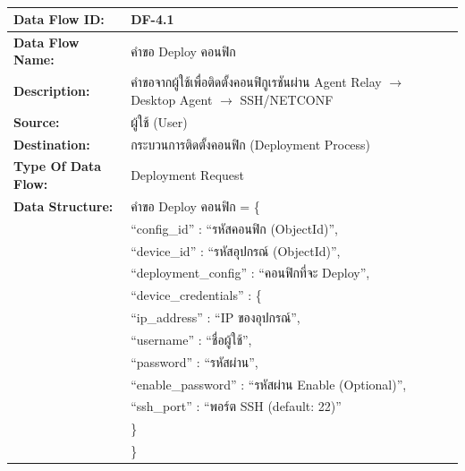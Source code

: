 \begin{table}[H]
    \caption{}
    \label{tab:df-4-1}
    \fontSixTeen 
    \begin{tabularx}{\textwidth}{|l|L|} 
        \hline
        \textbf{Data Flow ID:} & DF-4.1 \\
        \hline
        \textbf{Data Flow Name:} & คำขอ Deploy คอนฟิก \\
        \hline
        \textbf{Description:} & คำขอจากผู้ใช้เพื่อติดตั้งคอนฟิกูเรชันผ่าน Agent Relay $\rightarrow$ Desktop Agent $\rightarrow$ SSH/NETCONF \\
        \hline
        \textbf{Source:} & ผู้ใช้ (User) \\
        \hline
        \textbf{Destination:} & กระบวนการติดตั้งคอนฟิก (Deployment Process) \\
        \hline
        \textbf{Type Of Data Flow:} & Deployment Request \\
        \hline
        \textbf{Data Structure:} & คำขอ Deploy คอนฟิก = \{ \nonumber \\
                        & \hspace{1em} ``config\_id'' : ``รหัสคอนฟิก (ObjectId)'', \nonumber \\
                        & \hspace{1em} ``device\_id'' : ``รหัสอุปกรณ์ (ObjectId)'', \nonumber \\
                        & \hspace{1em} ``deployment\_config'' : ``คอนฟิกที่จะ Deploy'', \nonumber \\
                        & \hspace{1em} ``device\_credentials'' : \{ \nonumber \\
                        & \hspace{2em} ``ip\_address'' : ``IP ของอุปกรณ์'', \nonumber \\
                        & \hspace{2em} ``username'' : ``ชื่อผู้ใช้'', \nonumber \\
                        & \hspace{2em} ``password'' : ``รหัสผ่าน'', \nonumber \\
                        & \hspace{2em} ``enable\_password'' : ``รหัสผ่าน Enable (Optional)'', \nonumber \\
                        & \hspace{2em} ``ssh\_port'' : ``พอร์ต SSH (default: 22)'' \nonumber \\
                        & \hspace{1em} \} \nonumber \\
                        & \} \\
        \hline
    \end{tabularx}
\end{table}

